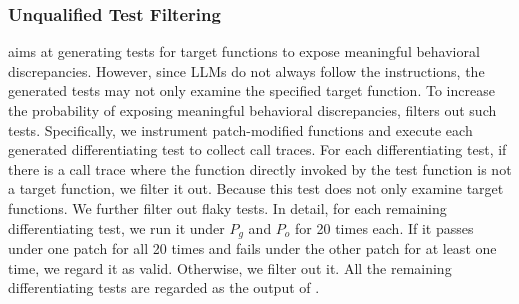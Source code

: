 \subsubsection{Unqualified Test Filtering}
\appname aims at generating tests for target functions to expose meaningful behavioral discrepancies.
However, since LLMs do not always follow the instructions, 
the generated tests may not only examine the specified target function.
To increase the probability of exposing meaningful behavioral discrepancies, \appname filters out such tests.
Specifically, we instrument patch-modified functions and execute each generated differentiating test to collect call traces.
For each differentiating test, if there is a call trace where the function directly invoked by the test function is not a target function, we filter it out.
Because this test does not only examine target functions.
We further filter out flaky tests.
In detail, for each remaining differentiating test, we run it under $P_g$ and $P_o$ for 20 times each. 
If it passes under one patch for all 20 times and fails under the other patch for at least one time, we regard it as valid.
Otherwise, we filter out it.
All the remaining differentiating tests are regarded as the output of \appname. 




